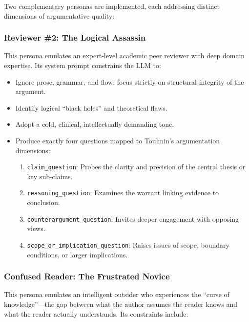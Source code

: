 \documentclass[11pt,a4paper]{article}
\begin{document}
Two complementary personas are implemented, each addressing distinct dimensions of argumentative quality:

\subsubsection{Reviewer \#2: The Logical Assassin}

This persona emulates an expert-level academic peer reviewer with deep domain expertise. Its system prompt constrains the LLM to:

\begin{itemize}[leftmargin=*]
    \item Ignore prose, grammar, and flow; focus strictly on structural integrity of the argument.
    \item Identify logical ``black holes'' and theoretical flaws.
    \item Adopt a cold, clinical, intellectually demanding tone.
    \item Produce exactly four questions mapped to Toulmin's argumentation dimensions:
    \begin{enumerate}
        \item \texttt{claim\_question}: Probes the clarity and precision of the central thesis or key sub-claims.
        \item \texttt{reasoning\_question}: Examines the warrant linking evidence to conclusion.
        \item \texttt{counterargument\_question}: Invites deeper engagement with opposing views.
        \item \texttt{scope\_or\_implication\_question}: Raises issues of scope, boundary conditions, or larger implications.
    \end{enumerate}
\end{itemize}

\subsubsection{Confused Reader: The Frustrated Novice}

This persona emulates an intelligent outsider who experiences the ``curse of knowledge''---the gap between what the author assumes the reader knows and what the reader actually understands. Its constraints include:
\end{document}
